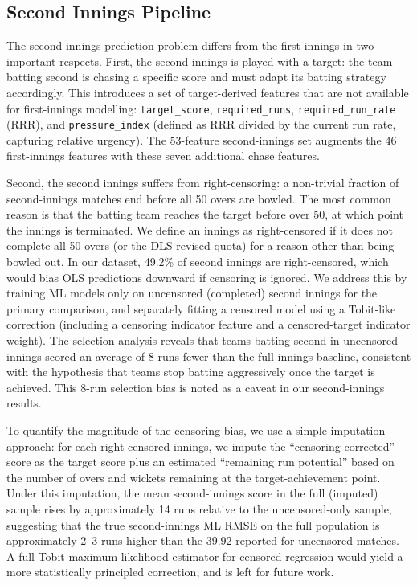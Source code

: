 \documentclass[10pt,a4paper,twocolumn]{article}
\begin{document}
\subsection{Second Innings Pipeline}
\label{sec:inn2}

The second-innings prediction problem differs from the first innings in two important respects. First, the second innings is played with a target: the team batting second is chasing a specific score and must adapt its batting strategy accordingly. This introduces a set of target-derived features that are not available for first-innings modelling: \texttt{target\_score}, \texttt{required\_runs}, \texttt{required\_run\_rate} (RRR), and \texttt{pressure\_index} (defined as RRR divided by the current run rate, capturing relative urgency). The 53-feature second-innings set augments the 46 first-innings features with these seven additional chase features.

Second, the second innings suffers from right-censoring: a non-trivial fraction of second-innings matches end before all 50 overs are bowled. The most common reason is that the batting team reaches the target before over 50, at which point the innings is terminated. We define an innings as right-censored if it does not complete all 50 overs (or the DLS-revised quota) for a reason other than being bowled out. In our dataset, 49.2\% of second innings are right-censored, which would bias OLS predictions downward if censoring is ignored. We address this by training ML models only on uncensored (completed) second innings for the primary comparison, and separately fitting a censored model using a Tobit-like correction (including a censoring indicator feature and a censored-target indicator weight). The selection analysis reveals that teams batting second in uncensored innings scored an average of 8 runs fewer than the full-innings baseline, consistent with the hypothesis that teams stop batting aggressively once the target is achieved. This 8-run selection bias is noted as a caveat in our second-innings results.

To quantify the magnitude of the censoring bias, we use a simple imputation approach: for each right-censored innings, we impute the ``censoring-corrected'' score as the target score plus an estimated ``remaining run potential'' based on the number of overs and wickets remaining at the target-achievement point. Under this imputation, the mean second-innings score in the full (imputed) sample rises by approximately 14 runs relative to the uncensored-only sample, suggesting that the true second-innings ML RMSE on the full population is approximately 2--3 runs higher than the 39.92 reported for uncensored matches. A full Tobit maximum likelihood estimator for censored regression would yield a more statistically principled correction, and is left for future work.
\end{document}
